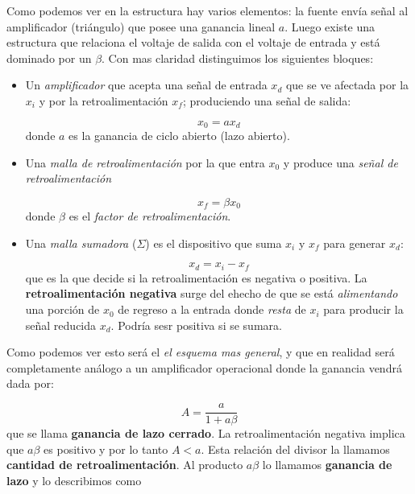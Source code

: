 \documentclass[11pt]{article} %
\begin{document}
Como podemos ver en la estructura hay varios elementos: la fuente envía señal al amplificador (triángulo) que posee una ganancia lineal $a$. Luego existe una estructura que relaciona el voltaje de salida con el voltaje de entrada y está dominado por un $\beta$. Con mas claridad distinguimos los siguientes bloques:



\begin{itemize}
\item Un \textit{amplificador} que acepta una señal de entrada $x_d$ que se ve afectada por la $x_i$ y por la retroalimentación $x_f$; produciendo una señal de salida:

\begin{equation}
x_0 = a x_d
\end{equation}
donde $a$ es la ganancia de ciclo abierto (lazo abierto).

\item Una \textit{malla de retroalimentación} por la que entra $x_0$ y produce una \textit{señal de retroalimentación}

\begin{equation}
x_f = \beta x_0
\end{equation}
donde $\beta$ es el \textit{factor de retroalimentación}.

\item Una \textit{malla sumadora} ($\Sigma$) es el dispositivo que suma $x_i$ y $x_f$ para generar $x_d$: 

\begin{equation}
x_d = x_i - x_f
\end{equation}
que es la que decide si la retroalimentación es negativa o positiva. La \textbf{retroalimentación negativa} surge del ehecho de que se está \textit{alimentando} una porción de $x_0$ de regreso a la entrada donde \textit{resta} de $x_i$ para producir la señal reducida $x_d$. Podría sesr positiva si se sumara.
\end{itemize}

Como podemos ver esto será el \textit{el esquema mas general}, y que en realidad será completamente análogo a un amplificador operacional donde la ganancia vendrá dada por:

\begin{equation}
A = \dfrac{a}{1+ a \beta}
\end{equation}
que se llama \textbf{ganancia de lazo cerrado}. La retroalimentación negativa implica que $a \beta$  es positivo y por lo tanto $A<a$. Esta relación del divisor la llamamos \textbf{cantidad de retroalimentación}. Al producto $a\beta$ lo llamamos \textbf{ganancia de lazo} y lo describimos como
\end{document}
